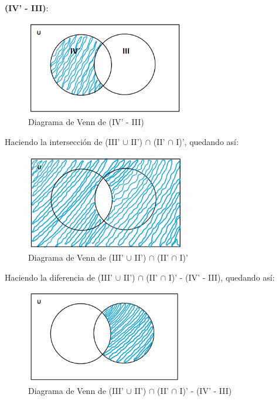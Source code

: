 \newpage

\textbf{(IV' - III)}:

\begin{figure}[htbp]
\centering
\includegraphics[width=7cm]{f/cc.png}
\caption[]{Diagrama de Venn de (IV' - III)}
\end{figure} 

Haciendo la intersección de (III' $\cup$ II') $\cap$ (II' $\cap$ I)', quedando así:

\begin{figure}[htbp]
\centering
\includegraphics[width=7cm]{f/aabb.png}
\caption[]{Diagrama de Venn de (III' $\cup$ II') $\cap$ (II' $\cap$ I)'}
\end{figure} 


Haciendo la diferencia de (III' $\cup$ II') $\cap$ (II' $\cap$ I)' - (IV' - III), quedando así:

\begin{figure}[htbp]
\centering
\includegraphics[width=7cm]{f/aabbcc.png}
\caption[]{Diagrama de Venn de (III' $\cup$ II') $\cap$ (II' $\cap$ I)' - (IV' - III)}
\end{figure} 